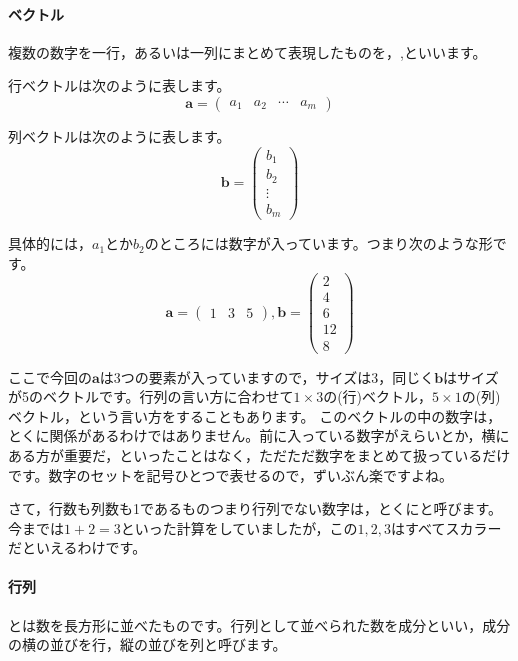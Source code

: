 \documentclass{ltjsbook}
\begin{document}
\paragraph{ベクトル}
複数の数字を一行，あるいは一列にまとめて表現したものを，,といいます。

行ベクトルは次のように表します。
\begin{equation*}
	\bm{a}=
	\begin{pmatrix}
		a_1 & a_2 & \cdots & a_m
	\end{pmatrix}
\end{equation*}

列ベクトルは次のように表します。
\begin{equation*}
	\bm{b}=
	\begin{pmatrix}
		b_1 \\ b_2\\ \vdots \\ b_m
	\end{pmatrix}
\end{equation*}

具体的には，$a_1$とか$b_2$のところには数字が入っています。つまり次のような形です。
\begin{equation*}
	\bm{a}=
	\begin{pmatrix}
		1 & 3 & 5
	\end{pmatrix},
	\bm{b}=
	\begin{pmatrix}
		2 \\ 4\\ 6\\ 12 \\ 8
	\end{pmatrix}
\end{equation*}

ここで今回の$\bm{a}$は3つの要素が入っていますので，サイズは3，同じく$\bm{b}$はサイズが5のベクトルです。行列の言い方に合わせて$1 \times 3$の(行)ベクトル，$5 \times 1$の(列)ベクトル，という言い方をすることもあります。
このベクトルの中の数字は，とくに関係があるわけではありません。前に入っている数字がえらいとか，横にある方が重要だ，といったことはなく，ただただ数字をまとめて扱っているだけです。数字のセットを記号ひとつで表せるので，ずいぶん楽ですよね。

さて，行数も列数も1であるものつまり行列でない数字は，とくにと呼びます。今までは$1+2=3$といった計算をしていましたが，この$1,2,3$はすべてスカラーだといえるわけです。

\paragraph{行列}
とは数を長方形に並べたものです。行列として並べられた数を成分といい，成分の横の並びを行，縦の並びを列と呼びます。
\end{document}
